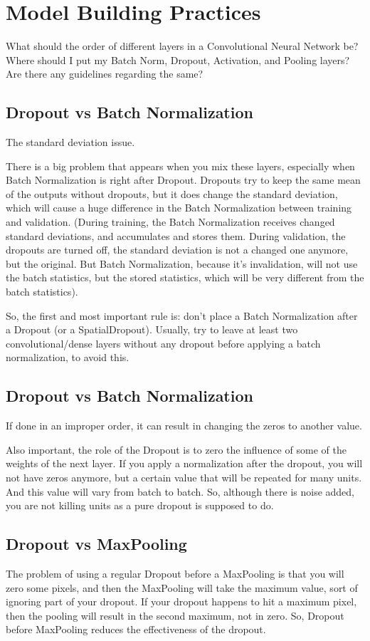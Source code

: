 	\section{Model Building Practices}
What should the order of different layers in a Convolutional Neural Network be? Where should I put my Batch Norm, Dropout, Activation, and Pooling layers?  Are there any guidelines regarding the same?

	\subsection{Dropout vs Batch Normalization}
The standard deviation issue.

There is a big problem that appears when you mix these layers, especially when Batch Normalization is right after Dropout.
Dropouts try to keep the same mean of the outputs without dropouts, but it does change the standard deviation, which will cause a huge difference in the Batch Normalization between training and validation. (During training, the Batch Normalization receives changed standard deviations, and accumulates and stores them. During validation, the dropouts are turned off, the standard deviation is not a changed one anymore, but the original. But Batch Normalization, because it's invalidation, will not use the batch statistics, but the stored statistics, which will be very different from the batch statistics).

So, the first and most important rule is: don't place a Batch Normalization after a Dropout (or a SpatialDropout).
Usually,  try to leave at least two convolutional/dense layers without any dropout before applying a batch normalization, to avoid this.

	\subsection{Dropout vs Batch Normalization}
If done in an improper order, it can result in changing the zeros to another value.

Also important, the role of the Dropout is to zero the influence of some of the weights of the next layer.  If you apply a normalization after the dropout, you will not have zeros anymore, but a certain value that will be repeated for many units.  And this value will vary from batch to batch. So, although there is noise added, you are not killing units as a pure dropout is supposed to do.

	\subsection{Dropout vs MaxPooling}
The problem of using a regular Dropout before a MaxPooling is that you will zero some pixels, and then the MaxPooling will take the maximum value, sort of ignoring part of your dropout. If your dropout happens to hit a maximum pixel, then the pooling will result in the second maximum, not in zero.
So, Dropout before MaxPooling reduces the effectiveness of the dropout.

